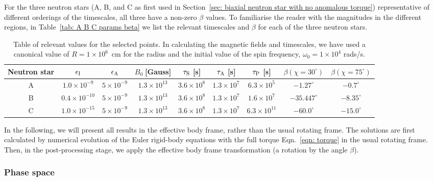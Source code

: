 \documentclass[../full_thesis/full_thesis.tex]{subfiles}
\begin{document}
For the three neutron stars (A, B, and C as first used in Section~\ref{sec:
biaxial neutron star with no anomalous torque}) representative of different orderings of
the timescales, all three have a non-zero $\beta$ values. To familiarise the
reader with the magnitudes in the different regions, in Table~\ref{tab: A B C
params beta} we list the relevant timescales and $\beta$ for each of the three
neutron stars.
\begin{table}[ht]
{\footnotesize
\centering
\tabcolsep=0.11cm
	\begin{tabular}[ht]{|c|c|c|c|c|c|c|c|c|}\hline
Neutron star &  $\epsilon_{\mathrm{I}}$  & $\epsilon_{\mathrm{A}} $ & 	$B_{0} \; $[Gauss] & $\tau_{\mathrm{S}}$ [s] & $\tau_{\mathrm{A}}$ [s] & $ \tau_{\mathrm{P}}$  [s] & $\beta (\chi=30^{\circ})$ & $\beta(\chi=75^{\circ})$ \\ \hline
A & $  1.0{\times} 10^{-9}  $ & $  5{\times} 10^{-9}  $ & $  1.3{\times} 10^{13}  $ & $  3.6{\times} 10^{8}  $ & $  1.3{\times} 10^{7}  $ & $  6.3{\times} 10^{5}  $ & $ -1.27^{\circ} $& $ -0.7^{\circ} $ \\
B & $  0.4{\times} 10^{-10}  $ & $  5{\times} 10^{-9}  $ & $  1.3{\times} 10^{13}  $ & $  3.6{\times} 10^{8}  $ & $  1.3{\times} 10^{7}  $ & $  1.6{\times} 10^{7}  $ & $ -35.447^{\circ} $& $ -8.35^{\circ} $ \\
C & $  1.0{\times} 10^{-15}  $ & $  5{\times} 10^{-9}  $ & $  1.3{\times} 10^{13}  $ & $  3.6{\times} 10^{8}  $ & $  1.3{\times} 10^{7}  $ & $  6.3{\times} 10^{11}  $ & $ -60.0^{\circ} $& $ -15.0^{\circ} $ \\ \hline
	\end{tabular}}
\caption{Table of relevant values for the selected points. In calculating the
    magnetic fields and timescales, we have used a canonical value of
    $R=1\times10^{6}$~cm for the radius and the initial value
    of the spin frequency, $\omega_{0} = 1\times10^{4}$ rads/s.}
\label{tab: A B C params beta}
\end{table}

In the following, we will present all results in the effective body frame,
rather than the usual rotating frame. The solutions are first calculated by
numerical evolution of the Euler rigid-body equations with the full torque
Eqn.~\eqref{eqn: torque} in the usual rotating frame. Then, in the
post-processing stage, we apply the effective body frame transformation (a
rotation by the angle $\beta$).

\subsubsection{Phase space}
\end{document}
